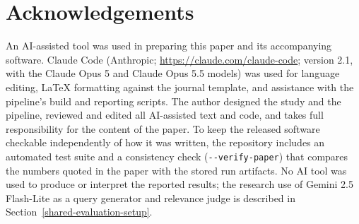 
\section*{Acknowledgements}

An AI-assisted tool was used in preparing this paper and its accompanying software. Claude
Code (Anthropic; \url{https://claude.com/claude-code}; version 2.1, with the Claude Opus 5
and Claude Opus 5.5 models) was used for language editing, LaTeX formatting against the journal template, and assistance with
the pipeline's build and reporting scripts. The author designed the study and the pipeline,
reviewed and edited all AI-assisted text and code, and takes full responsibility for the
content of the paper. To keep the released software checkable independently of how it was
written, the repository includes an automated test suite and a consistency check
(\texttt{-{}-verify-paper}) that compares the numbers quoted in the paper with the stored run
artifacts. No AI tool was
used to produce or interpret the reported results; the research use of Gemini 2.5 Flash-Lite
as a query generator and relevance judge is described in
Section~\ref{shared-evaluation-setup}.
